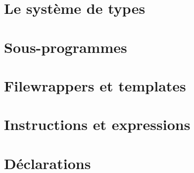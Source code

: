 \documentclass [a4paper, 10pt, openany] {book}
\begin{document}
\part{Le système de types}
  
  
  
  
  
  
  
  
  
  
  
  
  
  
  
  
  
  
  
  
  
  
  
  
%  
  
  
  

\part{Sous-programmes}





\part{Filewrappers et templates}



\part{Instructions et expressions}










\part{Déclarations}
\end{document}
